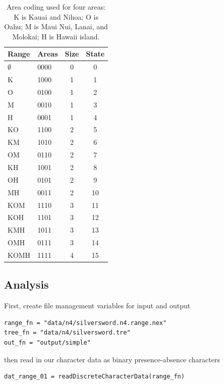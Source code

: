 \begin{table}[!ht]
\centering
\scriptsize
\begin{tabular}{llcc}
Range & Areas & Size & State \\ \hline
$\emptyset$ & 0000 & 0 & 0 \\
K    & 1000 & 1 & 1 \\
O    & 0100 & 1 & 2 \\
M    & 0010 & 1 & 3 \\
H    & 0001 & 1 & 4 \\
KO   & 1100 & 2 & 5 \\
KM   & 1010 & 2 & 6 \\
OM   & 0110 & 2 & 7 \\
KH   & 1001 & 2 & 8 \\
OH   & 0101 & 2 & 9 \\
MH   & 0011 & 2 & 10 \\
KOM  & 1110 & 3 & 11 \\ 
KOH  & 1101 & 3 & 12 \\
KMH  & 1011 & 3 & 13 \\
OMH  & 0111 & 3 & 14 \\
KOMH & 1111 & 4 & 15 \\
\end{tabular}
\caption{Area coding used for four areas: K is Kauai and Nihoa; O is Oahu; M is Maui Nui, Lanai, and Molokai; H is Hawaii island.}
\end{table}

\subsection*{Analysis}

First, create file management variables for input and output

\begin{snugshade*}
\begin{lstlisting}
range_fn = "data/n4/silversword.n4.range.nex"
tree_fn = "data/n4/silversword.tre"
out_fn = "output/simple"
\end{lstlisting}
\end{snugshade*}

then read in our character data as binary presence-absence characters

\begin{snugshade}
\begin{lstlisting}
dat_range_01 = readDiscreteCharacterData(range_fn)
\end{lstlisting}
\end{snugshade}

